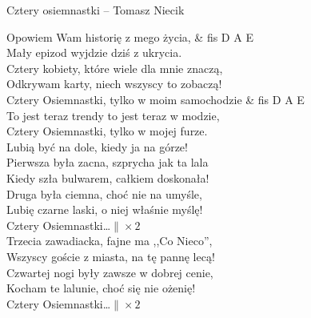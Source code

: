 \begin{piosenka}{Cztery osiemnastki -- Tomasz Niecik}

Opowiem Wam historię z mego życia, & fis D A E \\
Mały epizod wyjdzie dziś z ukrycia. \\
Cztery kobiety, które wiele dla mnie znaczą, \\
Odkrywam karty, niech wszyscy to zobaczą! \\[\zwrotkaspace]

 Cztery Osiemnastki, tylko w moim samochodzie & fis D A E \\
 To jest teraz trendy to jest teraz w modzie, \\
 Cztery Osiemnastki, tylko w mojej furze. \\
 Lubią być na dole, kiedy ja na górze! \\[\zwrotkaspace]

Pierwsza była zacna, szprycha jak ta lala \\
Kiedy szła bulwarem, całkiem doskonała! \\
Druga była ciemna, choć nie na umyśle, \\
Lubię czarne laski, o niej właśnie myślę! \\[\zwrotkaspace]

 Cztery Osiemnastki\ldots $\| \times 2$ \\[\zwrotkaspace]

Trzecia zawadiacka, fajne ma ,,Co Nieco'', \\
Wszyscy goście z miasta, na tę pannę lecą! \\
Czwartej nogi były zawsze w dobrej cenie, \\
Kocham te lalunie, choć się nie ożenię! \\[\zwrotkaspace]

 Cztery Osiemnastki\ldots $\| \times 2$ \\[\zwrotkaspace]

\end{piosenka}